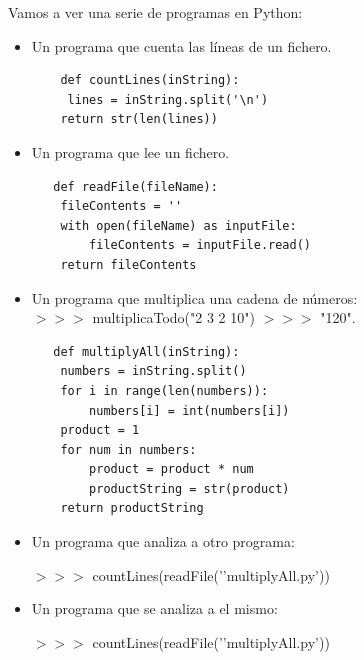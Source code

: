 \documentclass[xcolor=table]{beamer}
\begin{document}
\begin{frame} [fragile] \scriptsize  

Vamos a ver una serie de programas en Python:

\begin{itemize}
    \item Un programa que cuenta las líneas de un fichero.

    \begin{verbatim}
    def countLines(inString):          
     lines = inString.split('\n')
    return str(len(lines))         
    \end{verbatim}

  \item Un programa que lee un fichero.
  \begin{verbatim}
   def readFile(fileName):
    fileContents = ''
    with open(fileName) as inputFile:
        fileContents = inputFile.read()
    return fileContents
\end{verbatim}
  \item Un programa que multiplica una cadena de números: \\ $ >>> $ multiplicaTodo("2 3 2 10") $ >>> $ "120".
    \begin{verbatim}
   def multiplyAll(inString): 
    numbers = inString.split()  
    for i in range(len(numbers)):  
        numbers[i] = int(numbers[i]) 
    product = 1  
    for num in numbers: 
        product = product * num   
        productString = str(product) 
    return productString 
    \end{verbatim}

\end{itemize}

\end{frame} 
\begin{frame}  \small  

\begin{itemize}
    \item Un programa que analiza a otro programa:

$ >>> $ countLines(readFile(’’multiplyAll.py’))

    \item Un programa que se analiza a el mismo:
    
    $ >>> $ countLines(readFile(’’multiplyAll.py’))

\end{itemize}


\end{frame} 
\end{document}
